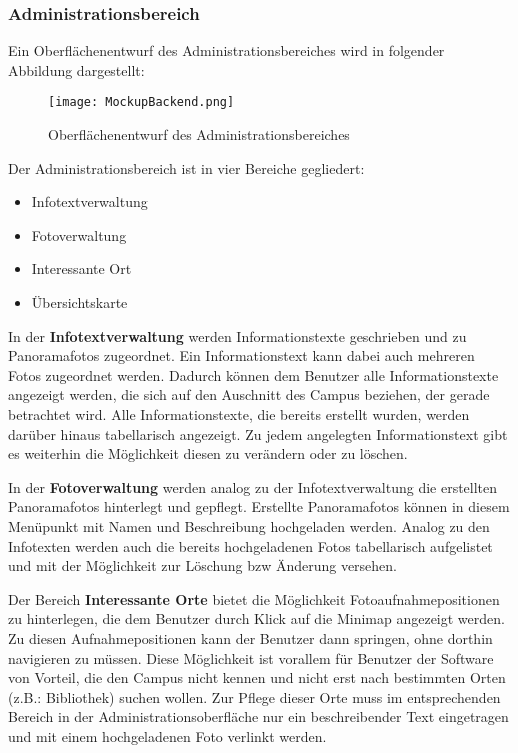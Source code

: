 \subsubsection{Administrationsbereich}
\label{sec:Administrationsbereich}

Ein Oberflächenentwurf des Administrationsbereiches wird in folgender Abbildung dargestellt:

\begin{figure}[htb]
\centering
\texttt{[image: MockupBackend.png]}
\caption[Mockup Backend]{Oberflächenentwurf des
Administrationsbereiches\protect\footnotemark}
\label{fig:MockupBackend}
\end{figure}

Der Administrationsbereich ist in vier Bereiche gegliedert:

\begin{itemize}
  \item Infotextverwaltung
  \item Fotoverwaltung
  \item Interessante Ort
  \item Übersichtskarte
\end{itemize}

In der \textbf{Infotextverwaltung} werden Informationstexte geschrieben und zu Panoramafotos zugeordnet. Ein Informationstext kann dabei auch mehreren Fotos zugeordnet werden. Dadurch können dem Benutzer alle Informationstexte angezeigt werden, die sich auf den Auschnitt des Campus beziehen, der gerade betrachtet wird. Alle Informationstexte, die bereits erstellt wurden, werden darüber hinaus tabellarisch angezeigt. Zu jedem angelegten Informationstext gibt es weiterhin die Möglichkeit diesen zu verändern oder zu löschen.

In der \textbf{Fotoverwaltung} werden analog zu der Infotextverwaltung die erstellten Panoramafotos hinterlegt und gepflegt. Erstellte Panoramafotos können in diesem Menüpunkt mit Namen und Beschreibung hochgeladen werden. Analog zu den Infotexten werden auch die bereits hochgeladenen Fotos tabellarisch aufgelistet und mit der Möglichkeit zur Löschung bzw Änderung versehen.

Der Bereich \textbf{Interessante Orte} bietet die Möglichkeit Fotoaufnahmepositionen zu hinterlegen, die dem Benutzer durch Klick auf die Minimap angezeigt werden. Zu diesen Aufnahmepositionen kann der Benutzer dann springen, ohne dorthin navigieren zu müssen. Diese Möglichkeit ist vorallem für Benutzer der Software von Vorteil, die den Campus nicht kennen und nicht erst nach bestimmten Orten (z.B.: Bibliothek) suchen wollen. Zur Pflege dieser Orte muss im entsprechenden Bereich in der Administrationsoberfläche nur ein beschreibender Text eingetragen und mit einem hochgeladenen Foto verlinkt werden.

